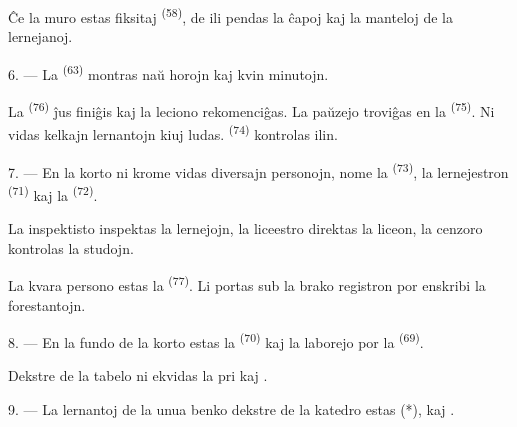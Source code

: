 Ĉe la muro estas fiksitaj  \textsuperscript{(58)}, de ili
pendas la ĉapoj kaj la manteloj de la lernejanoj.

\VUsaut{5.2mm}
\VUsaut{3.6mm}

6. --- La  \textsuperscript{(63)} montras naŭ horojn kaj kvin
minutojn.

La  \textsuperscript{(76)} ĵus finiĝis kaj la leciono
rekomenciĝas. La paŭzejo troviĝas en la  \textsuperscript{(75)}.
Ni vidas kelkajn lernantojn kiuj ludas. 
\textsuperscript{(74)} kontrolas ilin.

7. --- En la korto ni krome vidas diversajn personojn, nome la
 \textsuperscript{(73)}, la lernejestron
 \textsuperscript{(71)} kaj la 
\textsuperscript{(72)}.

La inspektisto inspektas la lernejojn, la liceestro direktas la liceon, la
cenzoro kontrolas la studojn.

La kvara persono estas la  \textsuperscript{(77)}. Li portas
sub la brako registron por enskribi la forestantojn.

8. --- En la fundo de la korto estas la 
\textsuperscript{(70)} kaj la laborejo por la 
\textsuperscript{(69)}.

Dekstre de la tabelo ni ekvidas la  pri 
kaj .


\VUsaut{2.4mm}

\VUsaut{3.0mm}

9. --- La lernantoj de la unua benko dekstre de la katedro estas
 (*),  kaj .

